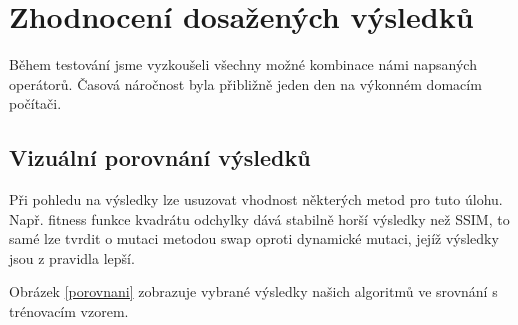 \documentclass[a4paper,11pt]{scrartcl}
\begin{document}
\section{Zhodnocení dosažených výsledků}
Během testování jsme vyzkoušeli všechny možné kombinace námi napsaných operátorů. Časová náročnost byla přibližně jeden den na výkonném domacím počítači. 

\subsection{Vizuální porovnání výsledků}
Při pohledu na výsledky lze usuzovat vhodnost některých metod pro tuto úlohu. Např. fitness funkce kvadrátu odchylky dává stabilně horší výsledky než SSIM, to samé lze tvrdit o mutaci metodou swap oproti dynamické mutaci, jejíž výsledky jsou z pravidla lepší.

Obrázek \ref{porovnani} zobrazuje vybrané výsledky našich algoritmů ve srovnání s trénovacím vzorem.
\end{document}
